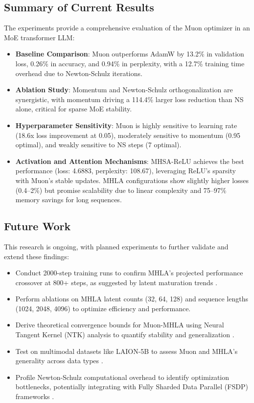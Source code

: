 \documentclass[11pt, a4paper]{article}
\begin{document}
{{\subsection{Summary of Current Results}
The experiments provide a comprehensive evaluation of the Muon optimizer in an MoE transformer LLM:
\begin{itemize}
    \item \textbf{Baseline Comparison}: Muon outperforms AdamW by 13.2\% in validation loss, 0.26\% in accuracy, and 0.94\% in perplexity, with a 12.7\% training time overhead due to Newton-Schulz iterations.
    \item \textbf{Ablation Study}: Momentum and Newton-Schulz orthogonalization are synergistic, with momentum driving a 114.4\% larger loss reduction than NS alone, critical for sparse MoE stability.
    \item \textbf{Hyperparameter Sensitivity}: Muon is highly sensitive to learning rate (18.6x loss improvement at 0.05), moderately sensitive to momentum (0.95 optimal), and weakly sensitive to NS steps (7 optimal).
    \item \textbf{Activation and Attention Mechanisms}: MHSA-ReLU achieves the best performance (loss: 4.6883, perplexity: 108.67), leveraging ReLU’s sparsity with Muon’s stable updates. MHLA configurations show slightly higher losses (0.4–2\%) but promise scalability due to linear complexity and 75–97\% memory savings for long sequences.
\end{itemize}

\subsection{Future Work}
This research is ongoing, with planned experiments to further validate and extend these findings:
\begin{itemize}
    \item Conduct 2000-step training runs to confirm MHLA’s projected performance crossover at 800+ steps, as suggested by latent maturation trends \cite{li2025transmla}.
    \item Perform ablations on MHLA latent counts (32, 64, 128) and sequence lengths (1024, 2048, 4096) to optimize efficiency and performance.
    \item Derive theoretical convergence bounds for Muon-MHLA using Neural Tangent Kernel (NTK) analysis to quantify stability and generalization \cite{jacot2018ntk}.
    \item Test on multimodal datasets like LAION-5B to assess Muon and MHLA’s generality across data types \cite{schuhmann2022laion}.
    \item Profile Newton-Schulz computational overhead to identify optimization bottlenecks, potentially integrating with Fully Sharded Data Parallel (FSDP) frameworks \cite{rosic2025muonrepo}.
\end{itemize}

}}
\end{document}
